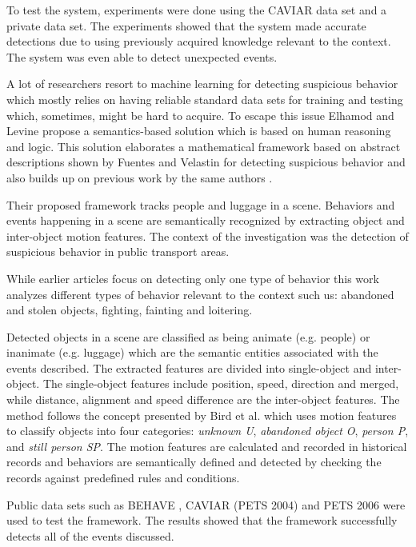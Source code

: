 To test the system, experiments were done using the CAVIAR data set \cite{n19} and a private data set. The experiments showed that the system made accurate detections due to using previously acquired knowledge relevant to the context. The system was even able to detect unexpected events.

A lot of researchers resort to machine learning for detecting suspicious behavior which mostly relies on having reliable standard data sets for training and testing which, sometimes, might be hard to acquire. To escape this issue Elhamod and Levine \cite{n2} propose a semantics-based solution which is based on human reasoning and logic. This solution elaborates a mathematical framework based on abstract descriptions shown by Fuentes and Velastin \cite{n3} for detecting suspicious behavior and also builds up on previous work by the same authors \cite{n4}.

Their proposed framework tracks people and luggage in a scene. Behaviors and events happening in a scene are semantically recognized by extracting object and inter-object motion features. The context of the investigation was the detection of suspicious behavior in public transport areas.

While earlier articles focus on detecting only one type of behavior \cite{n5,n6} this work analyzes different types of behavior relevant to the context such us: abandoned and stolen objects, fighting, fainting and loitering.

Detected objects in a scene are classified as being animate (e.g. people) or inanimate (e.g. luggage) which are the semantic entities associated with the events described. The extracted features are divided into single-object and inter-object. The single-object features include position, speed, direction and merged, while distance, alignment and speed difference are the inter-object features. The method follows the concept presented by Bird et al. \cite{n6} which uses motion features to classify objects into four categories: \textit{unknown U}, \textit{abandoned object O}, \textit{person P}, and \textit{still person SP}. The motion features are calculated and recorded in historical records and behaviors are semantically defined and detected by checking the records against predefined rules and conditions.

Public data sets such as BEHAVE \cite{n20}, CAVIAR (PETS 2004) \cite{n21} and PETS 2006 \cite{n22} were used to test the framework. The results showed that the framework successfully detects all of the events discussed.

